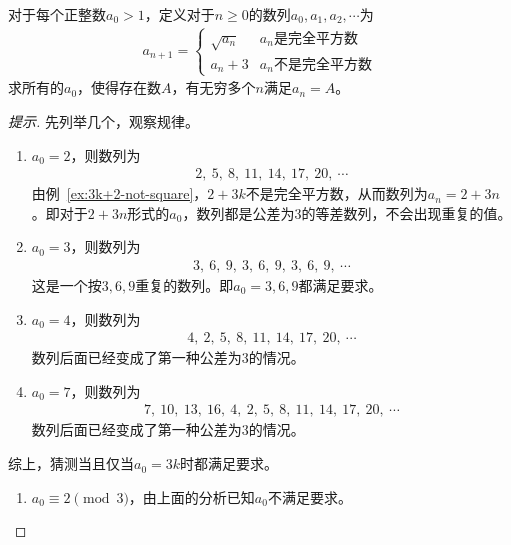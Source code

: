 \begin{example}[IMO 2017]
  对于每个正整数$a_0>1$，定义对于$n\ge0$的数列$a_0,a_1,a_2,\cdots$为
  \begin{align*}
    a_{n+1} = 
    \begin{cases}
      \sqrt{a_n} & a_n\text{是完全平方数}\\
      a_n + 3    & a_n\text{不是完全平方数}
    \end{cases}
  \end{align*}
  求所有的$a_0$，使得存在数$A$，有无穷多个$n$满足$a_n=A$。
\end{example}
\begin{proof}[提示]
  先列举几个，观察规律。

  \begin{enumerate}
  \item $a_0 = 2$，则数列为
    \begin{align*}
      2,\ 5,\ 8,\ 11,\ 14,\ 17,\ 20,\ \cdots
    \end{align*}
    由例~\ref{ex:3k+2-not-square}，$2+3k$不是完全平方数，从而数列为$a_n = 2 + 3n$。即对于$2+3n$形式的$a_0$，数列都是公差为3的等差数列，不会出现重复的值。

  \item $a_0=3$，则数列为
    \begin{align*}
      3,\ 6,\ 9,\ 3,\ 6,\ 9,\ 3,\ 6,\ 9,\ \cdots
    \end{align*}
    这是一个按$3,6,9$重复的数列。即$a_0=3,6,9$都满足要求。

  \item $a_0=4$，则数列为
    \begin{align*}
      4,\ 2,\ 5,\ 8,\ 11,\ 14,\ 17,\ 20,\ \cdots
    \end{align*}
    数列后面已经变成了第一种公差为3的情况。
    
  \item $a_0=7$，则数列为
    \begin{align*}
      7,\ 10,\ 13,\ 16,\ 4,\ 2,\ 5,\ 8,\ 11,\ 14,\ 17,\ 20,\ \cdots
    \end{align*}
    数列后面已经变成了第一种公差为3的情况。
  \end{enumerate}

  综上，猜测当且仅当$a_0 = 3k$时都满足要求。

  \begin{enumerate}
  \item $a_0\equiv2\pmod3$，由上面的分析已知$a_0$不满足要求。
    

\end{enumerate}
\end{proof}
